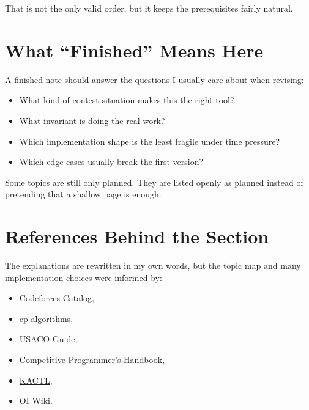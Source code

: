 That is not the only valid order, but it keeps the prerequisites fairly natural.

\section*{What ``Finished'' Means Here}

A finished note should answer the questions I usually care about when revising:

\begin{itemize}
  \item What kind of contest situation makes this the right tool?
  \item What invariant is doing the real work?
  \item Which implementation shape is the least fragile under time pressure?
  \item Which edge cases usually break the first version?
\end{itemize}

Some topics are still only planned. They are listed openly as planned instead of pretending that a shallow page
is enough.

\section*{References Behind the Section}

The explanations are rewritten in my own words, but the topic map and many implementation choices were informed by:

\begin{itemize}
  \item \href{https://codeforces.com/catalog}{Codeforces Catalog},
  \item \href{https://cp-algorithms.com/}{cp-algorithms},
  \item \href{https://usaco.guide/}{USACO Guide},
  \item \href{https://usaco.guide/CPH.pdf}{Competitive Programmer's Handbook},
  \item \href{https://github.com/kth-competitive-programming/kactl}{KACTL},
  \item \href{https://oi-wiki.org/}{OI Wiki}.
\end{itemize}
